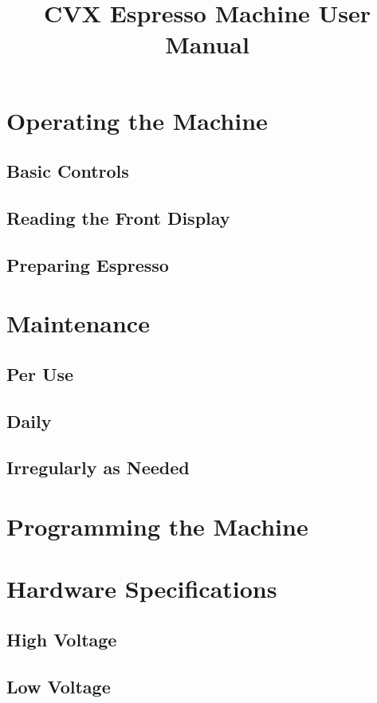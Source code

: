 \documentclass[10pt]{extarticle}
\title{CVX Espresso Machine User Manual}
\author{}
\date{}
\begin{document}
	
	\maketitle
	\newpage
	\tableofcontents
	\newpage	
	
	\section{Operating the Machine}
	\subsection{Basic Controls}
	
	\subsection{Reading the Front Display}
	
	\subsection{Preparing Espresso}

	\newpage\section{Maintenance}
	\subsection{Per Use}
	
	\subsection{Daily}
	
	\subsection{Irregularly as Needed}
	
	\newpage\section{Programming the Machine}
	
	\section{Hardware Specifications}
	\subsection{High Voltage}
	
	\subsection{Low Voltage}
\end{document}

